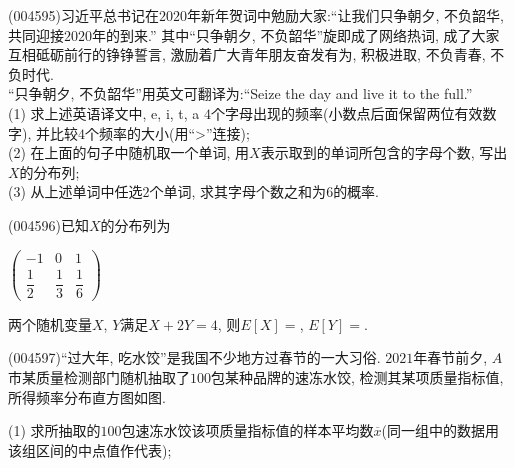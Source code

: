 \item (004595)习近平总书记在$2020$年新年贺词中勉励大家:``让我们只争朝夕, 不负韶华, 共同迎接$2020$年的到来.'' 其中``只争朝夕, 不负韶华''旋即成了网络热词, 成了大家互相砥砺前行的铮铮誓言, 激励着广大青年朋友奋发有为, 积极进取, 不负青春, 不负时代.\\
``只争朝夕, 不负韶华''用英文可翻译为:``Seize the day and live it to the full.''\\
(1) 求上述英语译文中, e, i, t, a $4$个字母出现的频率(小数点后面保留两位有效数字), 并比较$4$个频率的大小(用``>''连接);\\
(2) 在上面的句子中随机取一个单词, 用$X$表示取到的单词所包含的字母个数, 写出$X$的分布列;\\
(3) 从上述单词中任选$2$个单词, 求其字母个数之和为$6$的概率.
\item (004596)已知$X$的分布列为
\begin{center}
    $\begin{pmatrix}
        -1 & 0 & 1 \\ 
        \dfrac 12 & \dfrac 13 & \dfrac 16 
    \end{pmatrix}$
\end{center}
两个随机变量$X$, $Y$满足$X+2Y=4$, 则$E[X]=$, $E[Y]=$.
\item (004597)``过大年, 吃水饺''是我国不少地方过春节的一大习俗. $2021$年春节前夕, $A$市某质量检测部门随机抽取了$100$包某种品牌的速冻水饺, 检测其某项质量指标值, 所得频率分布直方图如图.
\begin{center}
\end{center}
(1) 求所抽取的$100$包速冻水饺该项质量指标值的样本平均数$\overline x$(同一组中的数据用该组区间的中点值作代表);\\
